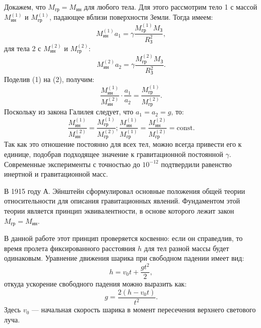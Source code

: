 \documentclass[a4paper,14pt]{extarticle}
\theoremstyle{plain}
\theoremstyle{remark}
\theoremstyle{definition}
\begin{document}
Докажем, что $M_{\text{гр}} = M_{\text{ин}}$ для любого тела. Для этого рассмотрим тело 1 с массой $M_{\text{ин}}^{(1)}$ и $M_{\text{гр}}^{(1)}$, падающее вблизи поверхности Земли. Тогда имеем:
\begin{equation}
M_{\text{ин}}^{(1)} a_1 = \gamma \frac{M_{\text{гр}}^{(1)} M_{\text{З}}}{R_{\text{З}}^2}, \tag{1}
\end{equation}
для тела 2 с $M_{\text{ин}}^{(2)}$ и $M_{\text{гр}}^{(2)}$:
\begin{equation}
M_{\text{ин}}^{(2)} a_2 = \gamma \frac{M_{\text{гр}}^{(2)} M_{\text{З}}}{R_{\text{З}}^2}. \tag{2}
\end{equation}
Поделив (1) на (2), получим:
\begin{equation}
\frac{M_{\text{ин}}^{(1)}} {M_{\text{ин}}^{(2)}}
\cdot \frac {a_1} {a_2} = \frac{M_{\text{гр}}^{(1)}}{M_{\text{гр}}^{(2)}}.
\end{equation}
Поскольку из закона Галилея следует, что $a_1 = a_2 = g$, то:
\begin{equation}
\frac{M_{\text{ин}}^{(1)}}{M_{\text{ин}}^{(2)}} = \frac{M_{\text{гр}}^{(1)}}{M_{\text{гр}}^{(2)}} ; \frac{M_{\text{ин}}^{(1)}}{M_{\text{гр}}^{(1)}} = \frac{M_{\text{ин}}^{(2)}}{M_{\text{гр}}^{(2)}} = \text{const}. \tag{3}
\end{equation}
Так как это отношение постоянно для всех тел, можно всегда привести его к единице, подобрав подходящее значение к гравитационной постоянной $\gamma$. Современные эксперименты с точностью до $10^{-12}$ подтвердили равенство инертной и гравитационной масс.

В 1915 году А. Эйнштейн сформулировал основные положения общей теории относительности для описания гравитационных явлений. Фундаментом этой теории является принцип эквивалентности, в основе которого лежит закон $M_{\text{гр}} = M_{\text{ин}}$.

В данной работе этот принцип проверяется косвенно: если он справедлив, то время пролета фиксированного расстояния $h$ для тел разной массы будет одинаковым. Уравнение движения шарика при свободном падении имеет вид:
\begin{equation}
h = v_0 t + \frac{gt^2}{2},
\end{equation}
откуда ускорение свободного падения можно выразить как:
\begin{equation}
g = \frac{2(h - v_0 t)}{t^2}. \tag{1}
\end{equation}
Здесь $v_0$ — начальная скорость шарика в момент пересечения верхнего светового луча.
\end{document}
